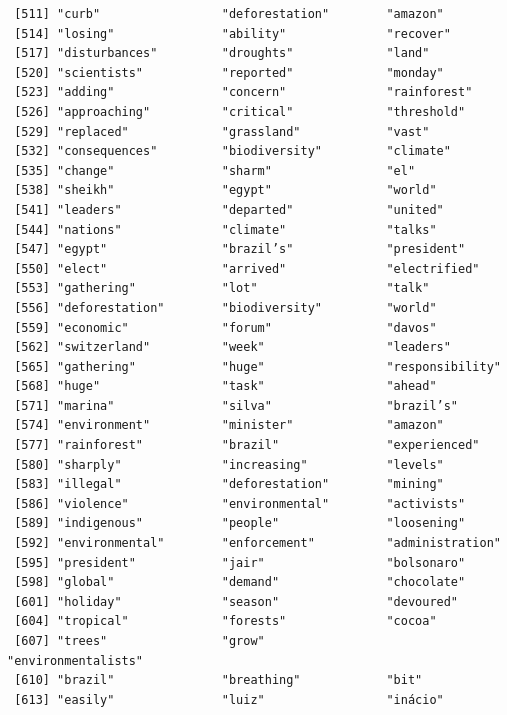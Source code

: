 \documentclass[
  letterpaper,
  DIV=11,
  numbers=noendperiod]{scrartcl}
\begin{document}
\begin{verbatim}
 [511] "curb"                 "deforestation"        "amazon"              
 [514] "losing"               "ability"              "recover"             
 [517] "disturbances"         "droughts"             "land"                
 [520] "scientists"           "reported"             "monday"              
 [523] "adding"               "concern"              "rainforest"          
 [526] "approaching"          "critical"             "threshold"           
 [529] "replaced"             "grassland"            "vast"                
 [532] "consequences"         "biodiversity"         "climate"             
 [535] "change"               "sharm"                "el"                  
 [538] "sheikh"               "egypt"                "world"               
 [541] "leaders"              "departed"             "united"              
 [544] "nations"              "climate"              "talks"               
 [547] "egypt"                "brazil’s"             "president"           
 [550] "elect"                "arrived"              "electrified"         
 [553] "gathering"            "lot"                  "talk"                
 [556] "deforestation"        "biodiversity"         "world"               
 [559] "economic"             "forum"                "davos"               
 [562] "switzerland"          "week"                 "leaders"             
 [565] "gathering"            "huge"                 "responsibility"      
 [568] "huge"                 "task"                 "ahead"               
 [571] "marina"               "silva"                "brazil’s"            
 [574] "environment"          "minister"             "amazon"              
 [577] "rainforest"           "brazil"               "experienced"         
 [580] "sharply"              "increasing"           "levels"              
 [583] "illegal"              "deforestation"        "mining"              
 [586] "violence"             "environmental"        "activists"           
 [589] "indigenous"           "people"               "loosening"           
 [592] "environmental"        "enforcement"          "administration"      
 [595] "president"            "jair"                 "bolsonaro"           
 [598] "global"               "demand"               "chocolate"           
 [601] "holiday"              "season"               "devoured"            
 [604] "tropical"             "forests"              "cocoa"               
 [607] "trees"                "grow"                 "environmentalists"   
 [610] "brazil"               "breathing"            "bit"                 
 [613] "easily"               "luiz"                 "inácio"              

\end{verbatim}
\end{document}
